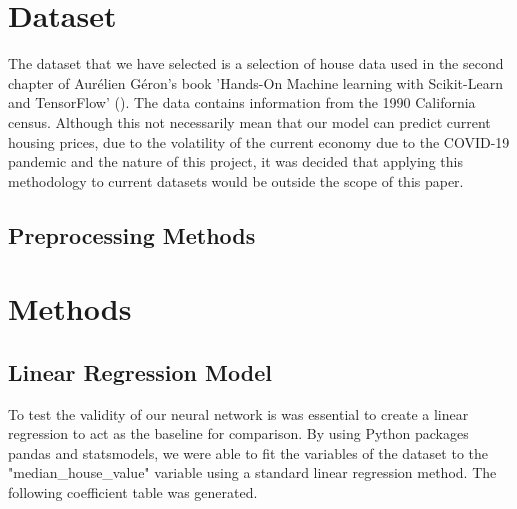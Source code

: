\documentclass[11pt]{article}
\begin{document}
\section{Dataset}

The dataset that we have selected is a selection of house data used in the second chapter of Aurélien Géron's book 'Hands-On Machine learning with Scikit-Learn and TensorFlow' (\citeyear{Geron2022}). The data contains information from the 1990 California census. Although this not necessarily mean that our model can predict current housing prices, due to the volatility of the current economy due to the COVID-19 pandemic and the nature of this project, it was decided that applying this methodology to current datasets would be outside the scope of this paper.

\subsection{Preprocessing Methods}



\section{Methods}

\subsection{Linear Regression Model}

To test the validity of our neural network is was essential to create a linear regression to act as the baseline for comparison. By using Python packages pandas and statsmodels, we were able to fit the variables of the dataset to the "median\_house\_value" variable using a standard linear regression method. The following coefficient table was generated.
\end{document}
